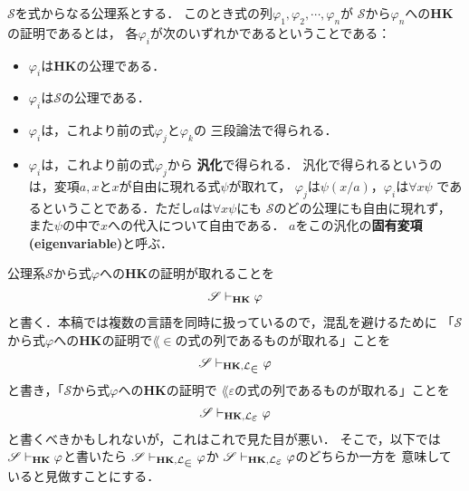 	\begin{screen}
		\begin{metadfn}[{\bf HK}における証明]
			$\mathscr{S}$を式からなる公理系とする．
			このとき式の列$\varphi_{1},\varphi_{2},\cdots,\varphi_{n}$が
			$\mathscr{S}$から$\varphi_{n}$への{\bf HK}の証明であるとは，
			各$\varphi_{i}$が次のいずれかであるということである：
			\begin{itemize}
				\item $\varphi_{i}$は{\bf HK}の公理である．
				\item $\varphi_{i}$は$\mathscr{S}$の公理である．
				\item $\varphi_{i}$は，これより前の式$\varphi_{j}$と$\varphi_{k}$の
					三段論法で得られる．
				\item $\varphi_{i}$は，これより前の式$\varphi_{j}$から
					{\bf 汎化}で得られる．
					汎化で得られるというのは，変項$a,x$と$x$が自由に現れる式$\psi$が取れて，
					$\varphi_{j}$は$\psi(x/a)$，$\varphi_{i}$は$\forall x \psi$
					であるということである．ただし$a$は$\forall x \psi$にも
					$\mathscr{S}$のどの公理にも自由に現れず，
					また$\psi$の中で$x$への代入について自由である．
					$a$をこの汎化の{\bf 固有変項}
					{\bf (eigenvariable)}と呼ぶ．
			\end{itemize}
		\end{metadfn}
	\end{screen}
	
	公理系$\mathscr{S}$から式$\varphi$への{\bf HK}の証明が取れることを
	\begin{align}
		\mathscr{S} \vdash_{{\scriptsize \mbox{{\bf HK}}}} \varphi
	\end{align}
	と書く．本稿では複数の言語を同時に扱っているので，混乱を避けるために
	「$\mathscr{S}$から式$\varphi$への{\bf HK}の証明で$\lang{\in}$の式の列であるものが取れる」ことを
	\begin{align}
		\mathscr{S} \provable{\mbox{{\bf HK}},\lang{\in}} \varphi
	\end{align}
	と書き，「$\mathscr{S}$から式$\varphi$への{\bf HK}の証明で
	$\lang{\varepsilon}$の式の列であるものが取れる」ことを
	\begin{align}
		\mathscr{S} \provable{\mbox{{\bf HK}},\lang{\varepsilon}} \varphi
	\end{align}
	と書くべきかもしれないが，これはこれで見た目が悪い．
	そこで，以下では$\mathscr{S} \vdash_{{\scriptsize \mbox{{\bf HK}}}} \varphi$と書いたら
	$\mathscr{S} \provable{\mbox{{\bf HK}},\lang{\in}} \varphi$か
	$\mathscr{S} \provable{\mbox{{\bf HK}},\lang{\varepsilon}} \varphi$のどちらか一方を
	意味していると見做すことにする．
	
